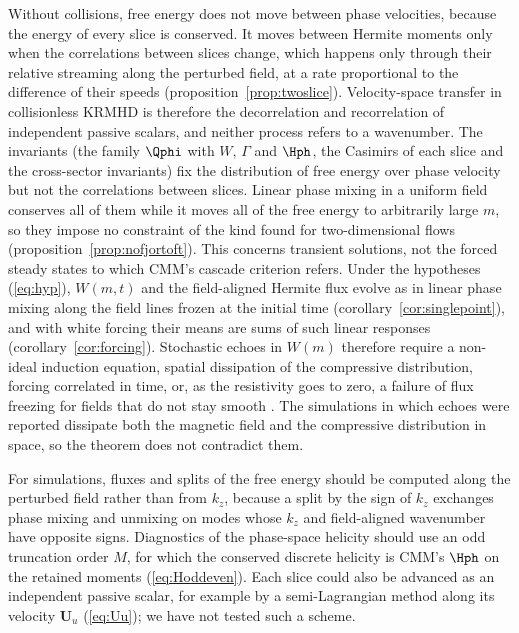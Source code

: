 Without collisions, free energy does not move between phase velocities, because the energy of every slice is conserved. It moves between Hermite moments only when the correlations between slices change, which happens only through their relative streaming along the perturbed field, at a rate proportional to the difference of their speeds (proposition~\ref{prop:twoslice}). Velocity-space transfer in collisionless KRMHD is therefore the decorrelation and recorrelation of independent passive scalars, and neither process refers to a wavenumber. The invariants (the family $\Qphi$ with $W$, $\Gamma$ and $\Hph$, the Casimirs of each slice and the cross-sector invariants) fix the distribution of free energy over phase velocity but not the correlations between slices. Linear phase mixing in a uniform field conserves all of them while it moves all of the free energy to arbitrarily large $m$, so they impose no constraint of the kind \citet{Fjortoft1953} found for two-dimensional flows (proposition~\ref{prop:nofjortoft}). This concerns transient solutions, not the forced steady states to which CMM's cascade criterion refers. Under the hypotheses (\ref{eq:hyp}), $W(m,t)$ and the field-aligned Hermite flux evolve as in linear phase mixing along the field lines frozen at the initial time (corollary~\ref{cor:singlepoint}), and with white forcing their means are sums of such linear responses (corollary~\ref{cor:forcing}). Stochastic echoes in $W(m)$ therefore require a non-ideal induction equation, spatial dissipation of the compressive distribution, forcing correlated in time, or, as the resistivity goes to zero, a failure of flux freezing for fields that do not stay smooth \citep{Eyink2013,Eyink2018,Jafari2026}. The simulations in which echoes were reported \citep{Meyrand2019} dissipate both the magnetic field and the compressive distribution in space, so the theorem does not contradict them.

For simulations, fluxes and splits of the free energy should be computed along the perturbed field rather than from $k_z$, because a split by the sign of $k_z$ exchanges phase mixing and unmixing on modes whose $k_z$ and field-aligned wavenumber have opposite signs. Diagnostics of the phase-space helicity should use an odd truncation order $M$, for which the conserved discrete helicity is CMM's $\Hph$ on the retained moments (\ref{eq:Hoddeven}). Each slice could also be advanced as an independent passive scalar, for example by a semi-Lagrangian method along its velocity $\boldsymbol U_u$ (\ref{eq:Uu}); we have not tested such a scheme.

